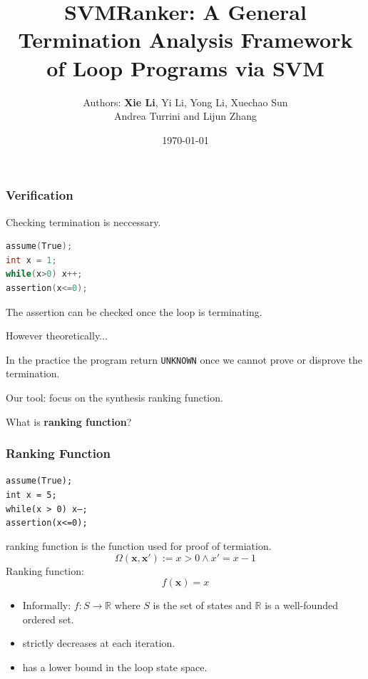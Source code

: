 \documentclass[11pt]{beamer}
\title{SVMRanker: A General Termination Analysis Framework of Loop Programs via SVM}
\author{
    Authors: \textbf{Xie Li}, Yi Li, Yong Li, Xuechao Sun \\Andrea Turrini and Lijun Zhang
}
\date{\today}
\begin{document}
\maketitle

\begin{frame}[fragile]\frametitle{Verification}
Checking termination is neccessary.
\begin{example}
\begin{minipage}{\linewidth}
\begin{lstlisting}[language=C++,
    xleftmargin=.3\textwidth, 
    xrightmargin=.3\textwidth]
assume(True);
int x = 1;
while(x>0) x++;
assertion(x<=0);
\end{lstlisting}
\end{minipage}
\end{example}
The assertion can be checked once the loop is terminating.


However theoretically...

In the practice the program return \texttt{UNKNOWN} once we cannot prove or disprove the termination.

Our tool: focus on the synthesis ranking function.

What is \textbf{ranking function}?
\end{frame}



\begin{frame}[fragile]\frametitle{Ranking Function}
\begin{multicols}{2}
\begin{minipage}{\linewidth}

\texttt{assume(True);}\\
\texttt{int x = 5;}\\
\texttt{while(x > 0) x--;}\\
\texttt{assertion(x<=0);}\\
\end{minipage}

ranking function is the function used for proof of termiation.
\[\Omega(\mathbf{x}, \mathbf{x}') := x > 0 \wedge x' = x - 1 \]
Ranking function: 
\[f(\mathbf{x}) = x\]

\begin{itemize}
\item Informally: $f: S\rightarrow \mathbb{R}$ where $S$ is the set of states and $\mathbb{R}$ is a well-founded ordered set.

\item strictly decreases at each iteration.

\item has a lower bound in the loop state space.

\end{itemize}

\end{multicols}
\end{frame}
\end{document}
